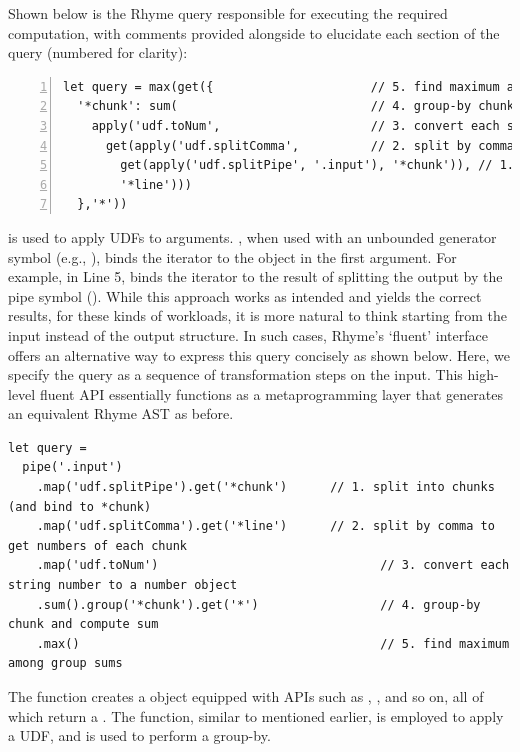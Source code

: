 \documentclass[runningheads]{llncs}
\newcommand{\lang}{Rhyme}
\begin{document}
Shown below is the \lang{} query responsible for executing the required
computation, with comments provided alongside to elucidate each section
of the query (numbered for clarity):

\begin{lstlisting}[style=JavaScript, columns=flexible, numbers=left]
let query = max(get({                      // 5. find maximum among group sums
  '*chunk': sum(                           // 4. group-by chunk and compute sum
    apply('udf.toNum',                     // 3. convert each string number to a number object
      get(apply('udf.splitComma',          // 2. split by comma to get numbers of each chunk
        get(apply('udf.splitPipe', '.input'), '*chunk')), // 1. split into chunks
        '*line')))
  },'*'))
\end{lstlisting}

 is used to apply UDFs to arguments.
, when used with an unbounded generator symbol (e.g., ), binds the
iterator to the object in the first argument.
For example, in Line 5,  binds the iterator
 to the result of splitting the output by the pipe symbol (\inline{|}).
While this approach works as intended and yields the correct results, 
for these kinds of workloads, it is more natural to think starting from the input
instead of the output structure.
In such cases, \lang{}'s `fluent' interface offers an alternative way to express
this query concisely as shown below.
Here, we specify the query as a sequence of transformation steps on the input.
This high-level fluent API essentially functions as a metaprogramming layer
that generates an equivalent \lang{} AST as before.

\begin{lstlisting}[style=JavaScript, columns=flexible]
let query =
  pipe('.input')
    .map('udf.splitPipe').get('*chunk')      // 1. split into chunks (and bind to *chunk)
    .map('udf.splitComma').get('*line')      // 2. split by comma to get numbers of each chunk
    .map('udf.toNum')                               // 3. convert each string number to a number object
    .sum().group('*chunk').get('*')                 // 4. group-by chunk and compute sum
    .max()                                          // 5. find maximum among group sums
\end{lstlisting}

The  function creates a  object equipped with
APIs such as , , and so on, all of which return a
.
The  function, similar to  mentioned earlier,
is employed to apply a UDF, and  is used to perform a group-by.
\end{document}
